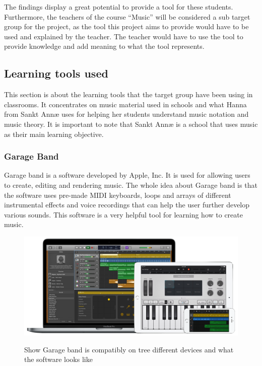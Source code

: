 The findings display a great potential to provide a tool for these students.
Furthermore, the teachers of the course “Music” will be considered a sub target group for the project, as the tool this project aims to provide would have to be used and explained by the teacher. The teacher would have to use the tool to provide knowledge and add meaning to what the tool represents.
 
 
\subsection{Learning tools used}%
This section is about the learning tools that the target group have been using in classrooms. It concentrates on music material used in schools and what Hanna from Sankt Annæ uses for helping her students understand music notation and music theory. It is important to note that Sankt Annæ is a school that uses music as their main learning objective.  

\subsubsection{Garage Band}
Garage band is a software developed by Apple, Inc. It is used for allowing users to create, editing and rendering music. The whole idea about Garage band is that the software uses pre-made MIDI keyboards, loops and arrays of different instrumental effects and voice recordings that can help the user further develop various sounds. This software is a very helpful tool for learning how to create music.\cite{Garageband}
\begin{figure}[H]
	\centering
	\includegraphics[width=0.7\linewidth]{figure/Analysis/garageband}
	\label{fig:garageband}
	\caption{Show Garage band is compatibly on tree different devices and what the software looks like \cite{Garageband}}
	
\end{figure}


